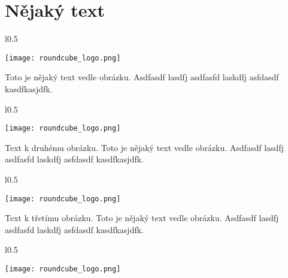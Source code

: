 \documentclass[12pt,a4paper,twoside]{book}
\begin{document}
\section{Nějaký text}

\begin{wrapfigure}{l}{0.5\textwidth}
  \vspace{-30pt}
  \begin{center}
    \texttt{[image: roundcube\_logo.png]}
  \end{center}
  \vspace{-10pt}
\end{wrapfigure}

Toto je nějaký text vedle obrázku. Asdfasdf lasdfj asdfasfd laskdfj asfdasdf kasdfkasjdfk.
\newline

\begin{wrapfigure}{l}{0.5\textwidth}
  \vspace{-20pt}
  \begin{center}
    \texttt{[image: roundcube\_logo.png]}
  \end{center}
  \vspace{-20pt}
\end{wrapfigure}

Text k druhému obrázku. Toto je nějaký text vedle obrázku. Asdfasdf lasdfj asdfasfd laskdfj asfdasdf kasdfkasjdfk.
\newline

\begin{wrapfigure}{l}{0.5\textwidth}
  \vspace{-20pt}
  \begin{center}
    \texttt{[image: roundcube\_logo.png]}
  \end{center}
  \vspace{-20pt}
\end{wrapfigure}

Text k třetímu obrázku. Toto je nějaký text vedle obrázku. Asdfasdf lasdfj asdfasfd laskdfj asfdasdf kasdfkasjdfk.
\newline

\begin{wrapfigure}{l}{0.5\textwidth}
  \vspace{-20pt}
  \begin{center}
    \texttt{[image: roundcube\_logo.png]}
  \end{center}
  \vspace{-20pt}
\end{wrapfigure}
\end{document}
